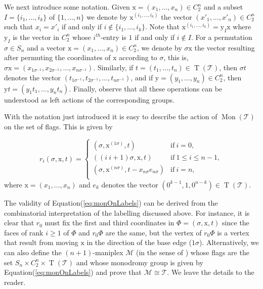 \documentclass[final]{amsart}
\theoremstyle{plain}
\theoremstyle{definition}
\theoremstyle{remark}
\numberwithin{equation}{section}
\renewcommand{\leq}{\leqslant} \renewcommand{\geq}{\geqslant}
\renewcommand{\{}{\lbrace}
\renewcommand{\}}{\rbrace}
\newcommand{\cM}{\mathcal{M}}
\newcommand{\cT}{\mathcal{T}}
\newcommand{\cyvec}[1]{{\mathrm{#1}}}
\newcommand{\vx}{\cyvec{x}}
\newcommand{\vy}{\cyvec{y}}
\DeclareMathOperator{\mon}{Mon}
\newcommand{\cyctwo}[1][n]{ C_{2}^{#1} }
\DeclareMathOperator{\tras}{T}
\begin{document}
We next introduce some notation. Given $\vx = (x_{1}, \dots, x_{n}) \in \cyctwo$ and a subset $I=\{i_{1},\dots, i_{k}\} $ of $ \{1, \dots, n\}$ we denote by $\vx^{(i_{1}, \dots, i_{k})}$ the vector $(x'_{1}, \dots, x'_{n}) \in \cyctwo$ such that $x_{i} = x'_{i}$ if and only if $i \not\in \{i_{1}, \dots, i_{k}\}$. Note that $\vx^{(i_{1}, \dots, i_{k})} = \vy_{I} \vx$ where $\vy_{I}$ is the vector in $\cyctwo$ whose $i^{th}$-entry is $1$ if and only if $i \not \in I$. 
For a permutation $\sigma \in S_{n}$ and a vector $\vx = (x_{1}, \dots, x_{n}) \in \cyctwo$, we denote by $\sigma \vx$ the vector resulting after permuting the coordinates of $\vx$ according to $\sigma$, this is, $\sigma \vx = (x_{1 \sigma^{-1}}, x_{2 \sigma^{-1}}, \dots, x_{n \sigma^{-1}} )$. 
Similarly, if $t= (t_{1}, \dots, t_{n}) \in \tras (\cT)$, then $\sigma t$ denotes the vector $(t_{1 \sigma^{-1}}, t_{2 \sigma^{-1}}, \dots, t_{n \sigma^{-1}} )$, and if $\vy =(y_{1}, \dots, y_{n}) \in \cyctwo$, then $\vy t =(y_{1}t_{1}, \dots, y_{n} t_{n})$. 
Finally, observe that all these operations can be understood as left actions of the corresponding groups.

With the notation just introduced it is easy to describe the action of $\mon(\cT)$ on the set of flags. This is given by

\begin{equation} \label{eq:monOnLabels}
	r_{i}(\sigma, \vx,  t) =
	\begin{cases}
		 ( \sigma, \vx^{(1\sigma)}, t) & \text{if}\  i=0, \\
		 ((i\ i+1) \sigma, \vx,  t) & \text{if}\ 1 \leq i \leq n-1, \\
		 ( \sigma, \vx^{(n \sigma)}, t-x_{n\sigma}e_{n\sigma}) & \text{if}\ i=n,\\
	\end{cases}
\end{equation}
where $\vx =  (x_{1}, \dots, x_{n})$ and $e_{k}$ denotes the vector $(0^{k-1}, 1, 0^{n-k}) \in\tras (\cT)$. 

The validity of Equation\nobreakspace \textup {(\ref {eq:monOnLabels})} can be derived from the combinatorial interpretation of the labelling discussed above. 
For instance, it is clear that $r_{0}$ must fix the first and third coordinates in $\Phi = (\sigma, \vx, t)$ since the faces of rank $i\geq 1$ of $\Phi$ and $r_0 \Phi$ are the same, but the vertex of $r_0 \Phi$ is a vertex that result from moving $\vx$ in the direction of the base edge ($1 \sigma$).
Alternatively, we can also define the $(n+1)$-maniplex $\cM$ (in the sense of \cite{Wilson_2012_ManiplexesPart1}) whose flags are the set $S_n \times C_{2}^{n} \times \tras(\cT)$ and whose monodromy group is given by Equation\nobreakspace \textup {(\ref {eq:monOnLabels})} and prove that $\cM \cong \cT$.
We leave the details to the reader. 
\end{document}
